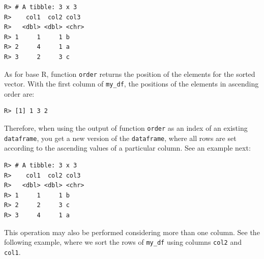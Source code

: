 \documentclass[
  12pt,
]{book}
\newenvironment{Shaded}{\begin{snugshade}}{\end{snugshade}}
\newcommand{\CommentTok}[1]{\textcolor[rgb]{0.37,0.37,0.37}{\textit{#1}}}
\newcommand{\FloatTok}[1]{\textcolor[rgb]{0.06,0.06,0.06}{#1}}
\newcommand{\FunctionTok}[1]{\textcolor[rgb]{0,0,0}{#1}}
\newcommand{\NormalTok}[1]{#1}
\newcommand{\OtherTok}[1]{\textcolor[rgb]{0.37,0.37,0.37}{#1}}
\newcommand{\SpecialCharTok}[1]{\textcolor[rgb]{0,0,0}{#1}}
\begin{document}
\begin{verbatim}
R> # A tibble: 3 x 3
R>    col1  col2 col3 
R>   <dbl> <dbl> <chr>
R> 1     1     1 b    
R> 2     4     1 a    
R> 3     2     3 c
\end{verbatim}

As for base R, function \texttt{order} returns the position of the elements for the sorted vector. With the first column of \texttt{my\_df}, the positions of the elements in ascending order are:

\begin{Shaded}
\end{Shaded}

\begin{verbatim}
R> [1] 1 3 2
\end{verbatim}

Therefore, when using the output of function \texttt{order} as an index of an existing \texttt{dataframe}, you get a new version of the \texttt{dataframe}, where all rows are set according to the ascending values of a particular column. See an example next:

\begin{Shaded}
\end{Shaded}

\begin{verbatim}
R> # A tibble: 3 x 3
R>    col1  col2 col3 
R>   <dbl> <dbl> <chr>
R> 1     1     1 b    
R> 2     2     3 c    
R> 3     4     1 a
\end{verbatim}

This operation may also be performed considering more than one column. See the following example, where we sort the rows of \texttt{my\_df} using columns \texttt{col2} and \texttt{col1}.
\end{document}

